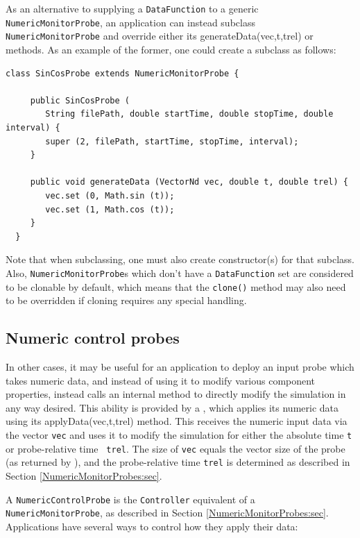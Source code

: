 As an alternative to supplying a {\tt DataFunction} to a generic {\tt
NumericMonitorProbe}, an application can instead subclass {\tt
NumericMonitorProbe} and override either its %
{generateData(vec,t,trel)} or 
methods. As an example of the former, one could create a subclass as
follows:
%
\begin{lstlisting}[]
  class SinCosProbe extends NumericMonitorProbe {
     
     public SinCosProbe (
        String filePath, double startTime, double stopTime, double interval) {
        super (2, filePath, startTime, stopTime, interval);
     }

     public void generateData (VectorNd vec, double t, double trel) {
        vec.set (0, Math.sin (t));
        vec.set (1, Math.cos (t));        
     }
  }
\end{lstlisting}
%
Note that when subclassing, one must also create constructor(s) for
that subclass. Also, {\tt NumericMonitorProbe}s which don't have a
{\tt DataFunction} set are considered to be clonable by default, which
means that the {\tt clone()} method may also need to be overridden if
cloning requires any special handling.

\subsection{Numeric control probes}
\label{NumericControlProbes:sec}

In other cases, it may be useful for an application to deploy an input
probe which takes numeric data, and instead of using it to modify
various component properties, instead calls an internal method to
directly modify the simulation in any way desired.  This ability is
provided by a ,
which applies its numeric data using its %
{applyData(vec,t,trel)} method. This receives the numeric input data
via the vector {\tt vec} and uses it to modify the simulation for
either the absolute time {\tt t} or probe-relative time {\tt
trel}. The size of {\tt vec} equals the vector size of the probe (as
returned by
), and
the probe-relative time {\tt trel} is determined as described in
Section \ref{NumericMonitorProbes:sec}.

A {\tt NumericControlProbe} is the {\tt Controller} equivalent
of a {\tt NumericMonitorProbe}, as described in Section 
\ref{NumericMonitorProbes:sec}. Applications have several ways to control
how they apply their data:

